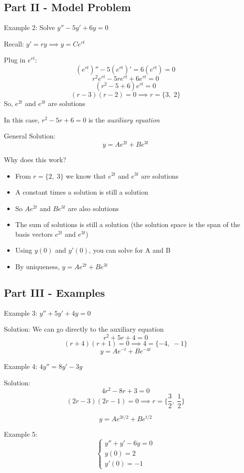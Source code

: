 \documentclass[12pt]{article}
\begin{document}
\subsection*{Part II - Model Problem}
Example 2: 
Solve $y'' - 5y' + 6y = 0$

Recall: $y' = ry \implies y = Ce^{rt}$

Plug in $e^{rt}$:
\[(e^{rt})'' - 5(e^{rt})' = 6(e^{rt}) = 0\]
\[r^2e^{rt} - 5re^{rt} + 6e^{rt} = 0\]
\[(r^2 - 5 + 6) e^{rt} = 0\]
\[(r - 3)(r - 2) = 0 \implies r = \{3, \; 2\}\]
So, $e^{2t}$ and $e^{3t}$ are solutions

In this case, $r^2 - 5r + 6 = 0$ is the \emph{auxiliary equation}

General Solution:
\[y = Ae^{2t} + Be^{3t}\]

Why does this work?
\begin{itemize}
    \item From $r = \{2, \; 3\}$ we know that $e^{2t}$ and $e^{3t}$ are solutions
    \item A constant times a solution is still a solution
    \item So $Ae^{2t}$ and $Be^{3t}$ are also solutions 
    \item The sum of solutions is still a solution (the solution space is the span of the basis vectors $e^{2t}$ and $e^{3t}$)
    \item Using $y(0)$ and $y'(0)$, you can solve for A and B
    \item By uniqueness, $y = Ae^{2t} + Be^{3t}$
\end{itemize}

\subsection*{Part III - Examples}
Example 3: $y'' + 5y' + 4y = 0$

Solution:
We can go directly to the auxiliary equation
\[r^2 + 5r + 4 = 0\]
\[(r + 4)(r + 1) = 0 \implies 4 = \{-4, \; -1\}\]
\[\boxed{y} = Ae^{-t} + Be^{-4t}\]

Example 4: $4y'' = 8y' - 3y$

Solution:
\[4r^2 - 8r + 3 = 0\]
\[(2r - 3)(2r - 1) = 0 \implies r = \{\frac{3}{2}, \; \frac{1}{2}\}\]

\[\boxed{y = Ae^{3t/2} + Be^{t/2}}\]

Example 5:
\[\begin{cases}
    y'' + y' - 6y = 0\\
    y(0) = 2\\
    y'(0) = -1
\end{cases}\]
\end{document}
